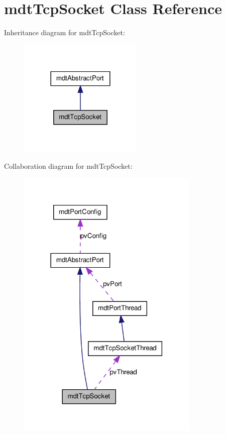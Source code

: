 \hypertarget{classmdt_tcp_socket}{
\section{mdtTcpSocket Class Reference}
\label{classmdt_tcp_socket}
}


Inheritance diagram for mdtTcpSocket:\nopagebreak
\begin{figure}[H]
\begin{center}
\leavevmode
\includegraphics[width=168pt]{classmdt_tcp_socket__inherit__graph}
\end{center}
\end{figure}


Collaboration diagram for mdtTcpSocket:\nopagebreak
\begin{figure}[H]
\begin{center}
\leavevmode
\includegraphics[width=246pt]{classmdt_tcp_socket__coll__graph}
\end{center}
\end{figure}
